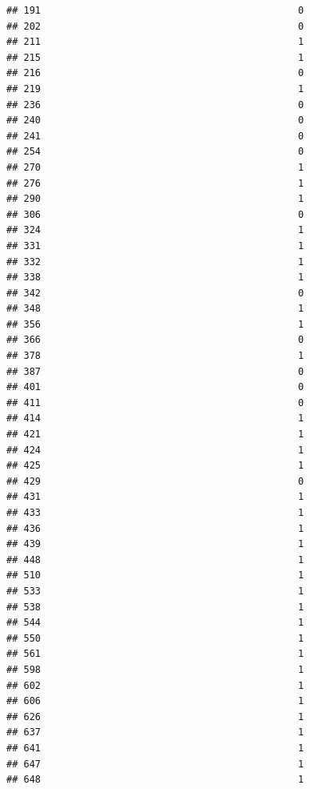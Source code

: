 \documentclass[
]{article}
\begin{document}
\begin{verbatim}
## 191                                             0
## 202                                             0
## 211                                             1
## 215                                             1
## 216                                             0
## 219                                             1
## 236                                             0
## 240                                             0
## 241                                             0
## 254                                             0
## 270                                             1
## 276                                             1
## 290                                             1
## 306                                             0
## 324                                             1
## 331                                             1
## 332                                             1
## 338                                             1
## 342                                             0
## 348                                             1
## 356                                             1
## 366                                             0
## 378                                             1
## 387                                             0
## 401                                             0
## 411                                             0
## 414                                             1
## 421                                             1
## 424                                             1
## 425                                             1
## 429                                             0
## 431                                             1
## 433                                             1
## 436                                             1
## 439                                             1
## 448                                             1
## 510                                             1
## 533                                             1
## 538                                             1
## 544                                             1
## 550                                             1
## 561                                             1
## 598                                             1
## 602                                             1
## 606                                             1
## 626                                             1
## 637                                             1
## 641                                             1
## 647                                             1
## 648                                             1

\end{verbatim}
\end{document}
